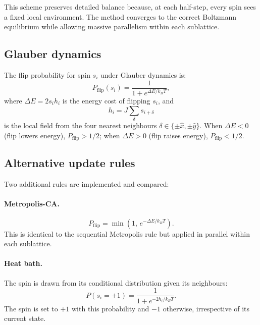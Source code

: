 \documentclass[11pt,a4paper]{article}
\begin{document}
This scheme preserves detailed balance because, at each half-step, every
spin sees a fixed local environment. The method converges to the correct
Boltzmann equilibrium while allowing massive parallelism within each sublattice.

\subsection{Glauber dynamics}

The flip probability for spin $s_i$ under Glauber dynamics is:
\begin{equation}
  P_\text{flip}(s_i) = \frac{1}{1 + e^{\Delta E / k_B T}},
  \label{eq:glauber}
\end{equation}
where $\Delta E = 2s_i h_i$ is the energy cost of flipping $s_i$, and
\begin{equation}
  h_i = J\sum_{\delta} s_{i+\delta}
\end{equation}
is the local field from the four nearest neighbours $\delta \in \{\pm\hat{x}, \pm\hat{y}\}$.
When $\Delta E < 0$ (flip lowers energy), $P_\text{flip} > 1/2$; when
$\Delta E > 0$ (flip raises energy), $P_\text{flip} < 1/2$.

\subsection{Alternative update rules}

Two additional rules are implemented and compared:

\paragraph{Metropolis-CA.}
\begin{equation}
  P_\text{flip} = \min\!\left(1,\, e^{-\Delta E / k_B T}\right).
\end{equation}
This is identical to the sequential Metropolis rule but applied in
parallel within each sublattice.

\paragraph{Heat bath.}
The spin is drawn from its conditional distribution given its neighbours:
\begin{equation}
  P(s_i = +1) = \frac{1}{1 + e^{-2h_i / k_B T}}.
\end{equation}
The spin is set to $+1$ with this probability and $-1$ otherwise,
irrespective of its current state.
\end{document}
